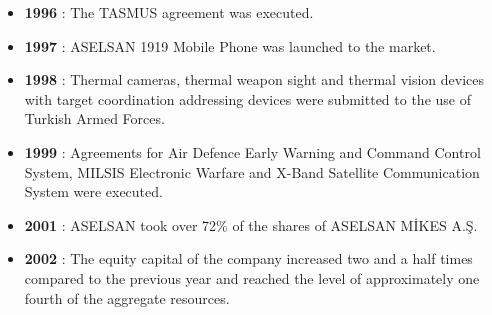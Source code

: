 \begin{itemize}
\item \textbf{ 1996 } : The TASMUS agreement was executed.
\item \textbf{ 1997 } : ASELSAN 1919 Mobile Phone was launched to the market.
\item \textbf{ 1998 } : Thermal cameras, thermal weapon sight and thermal vision devices with target coordination addressing devices were submitted to the use of Turkish Armed Forces.
\item \textbf{ 1999 } : Agreements for Air Defence Early Warning and Command Control System, MILSIS Electronic Warfare and X-Band Satellite Communication System were executed.
\item \textbf{ 2001 } : ASELSAN took over 72\% of the shares of ASELSAN MİKES A.Ş.
\item \textbf{ 2002 } : The equity capital of the company increased two and a half times compared to the previous year and reached the level of approximately one fourth of the aggregate resources.

\end{itemize}

